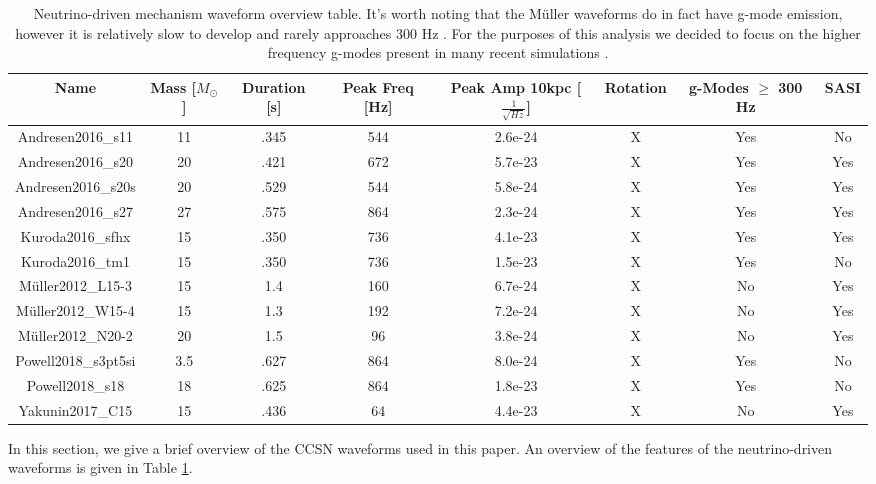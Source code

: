 \documentclass[letterpaper, aps, prd, twocolumn, superscriptaddress, showpacs, nofootinbib]{revtex4}
\begin{document}
\begin{table}[htb!]
\begin{center}
\begin{tabular}{|c|c|c|c|c|c|c|c|} %
 \hline
Name & Mass [$M_{\odot}$] & Duration [s] & Peak Freq [Hz] & Peak Amp 10kpc [$\frac{1}{\sqrt{Hz}}$] & Rotation & g-Modes $\geq$ 300 Hz & SASI \\ 
 \hline
Andresen2016\_s11 & 11 & .345 & 544 & 2.6e-24 & X & Yes & No \\ 
 \hline
Andresen2016\_s20 & 20 & .421 & 672 & 5.7e-23 & X & Yes & Yes \\
 \hline
Andresen2016\_s20s & 20 & .529 & 544 & 5.8e-24 & X & Yes & Yes \\
 \hline
Andresen2016\_s27 & 27 & .575 & 864 & 2.3e-24 & X & Yes & Yes \\
 \hline
Kuroda2016\_sfhx & 15 & .350 & 736 & 4.1e-23 & X & Yes & Yes \\
 \hline
Kuroda2016\_tm1 & 15 & .350 & 736 & 1.5e-23 & X & Yes & No \\
 \hline
M\"uller2012\_L15-3 & 15 & 1.4 & 160 & 6.7e-24 & X & No & Yes \\
 \hline
M\"uller2012\_W15-4 & 15 & 1.3 & 192 & 7.2e-24 & X & No & Yes \\
 \hline
M\"uller2012\_N20-2 & 20 & 1.5 & 96 & 3.8e-24 & X & No & Yes \\
 \hline
Powell2018\_s3pt5si & 3.5 & .627 & 864 & 8.0e-24 & X & Yes & No \\
 \hline
Powell2018\_s18 & 18 & .625 & 864 & 1.8e-23 & X & Yes & No \\
 \hline
Yakunin2017\_C15 & 15 & .436 & 64 & 4.4e-23 & X & No & Yes \\
 \hline
 \end{tabular}
\caption{Neutrino-driven mechanism waveform overview table. It's worth noting that the M\"uller waveforms do in fact have g-mode emission, however it is relatively slow to develop and rarely approaches 300 Hz \cite{mueller:e12}. For the purposes of this analysis we decided to focus on the higher frequency g-modes present in many recent simulations \cite{andresen:16, kuroda:16}.}
\label{tab:neutrino_waves}
\end{center}
\end{table}

In this section, we give a brief overview of the CCSN waveforms used in this paper. An overview of the features of the neutrino-driven waveforms is given in Table \ref{tab:neutrino_waves}. %
\end{document}
